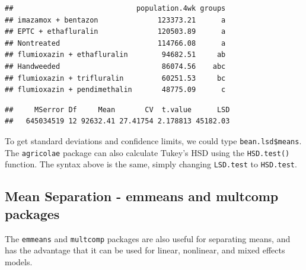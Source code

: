 \documentclass[letterpaper,]{book}
\newenvironment{Shaded}{\begin{snugshade}}{\end{snugshade}}
\newcommand{\DataTypeTok}[1]{\textcolor[rgb]{0.13,0.29,0.53}{#1}}
\newcommand{\KeywordTok}[1]{\textcolor[rgb]{0.13,0.29,0.53}{\textbf{#1}}}
\newcommand{\NormalTok}[1]{#1}
\newcommand{\OperatorTok}[1]{\textcolor[rgb]{0.81,0.36,0.00}{\textbf{#1}}}
\newcommand{\StringTok}[1]{\textcolor[rgb]{0.31,0.60,0.02}{#1}}
\begin{document}
\begin{Shaded}
\end{Shaded}

\begin{verbatim}
##                             population.4wk groups
## imazamox + bentazon              123373.21      a
## EPTC + ethafluralin              120503.89      a
## Nontreated                       114766.08      a
## flumioxazin + ethafluralin        94682.51     ab
## Handweeded                        86074.56    abc
## flumioxazin + trifluralin         60251.53     bc
## flumioxazin + pendimethalin       48775.09      c
\end{verbatim}

\begin{Shaded}
\end{Shaded}

\begin{verbatim}
##     MSerror Df     Mean       CV  t.value      LSD
##   645034519 12 92632.41 27.41754 2.178813 45182.03
\end{verbatim}

To get standard deviations and confidence limits, we could type \texttt{bean.lsd\$means}. The \texttt{agricolae} package can also calculate Tukey's HSD using the \texttt{HSD.test()} function. The syntax above is the same, simply changing \texttt{LSD.test} to \texttt{HSD.test}.

\hypertarget{mean-separation---emmeans-and-multcomp-packages}{%
\subsection{Mean Separation - emmeans and multcomp packages}\label{mean-separation---emmeans-and-multcomp-packages}}

The \texttt{emmeans} and \texttt{multcomp} packages are also useful for separating means, and has the advantage that it can be used for linear, nonlinear, and mixed effects models.
\end{document}
